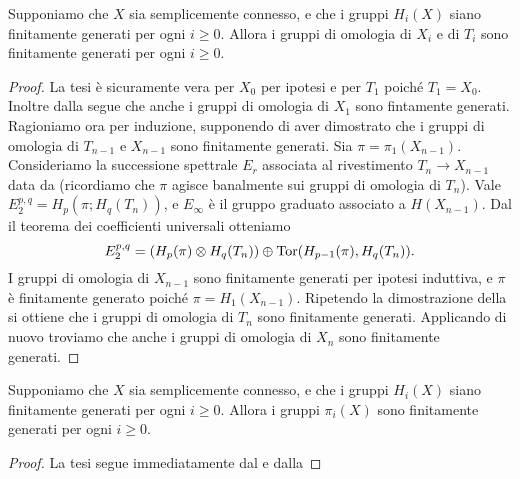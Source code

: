 \begin{proposition}
Supponiamo che $X$ sia semplicemente connesso, e che i gruppi $H_i(X)$ siano finitamente generati per ogni $i\ge 0$. Allora i gruppi di omologia di $X_i$ e di $T_i$ sono finitamente generati per ogni $i\ge 0$.
\end{proposition}
\begin{proof}
La tesi è sicuramente vera per $X_0$ per ipotesi e per $T_1$ poiché $T_1=X_0$. Inoltre dalla  segue che anche i gruppi di omologia di $X_1$ sono fintamente generati. Ragioniamo ora per induzione, supponendo di aver dimostrato che i gruppi di omologia di $T_{n-1}$ e $X_{n-1}$ sono finitamente generati. Sia $\pi=\pi_1(X_{n-1})$. Consideriamo la successione spettrale $E_r$ associata al rivestimento $T_n\to X_{n-1}$ data da \missing{} (ricordiamo che $\pi$ agisce banalmente sui gruppi di omologia di $T_n$). Vale $E^{p,q}_2=H_p(\pi;H_q(T_n))$, e $E_\infty$ è il gruppo graduato associato a $H(X_{n-1})$. Dal il teorema dei coefficienti universali otteniamo
$$
E^{p,q}_2=(H_p(\pi)\mathbin{\otimes} H_q(T_n))\mathbin{\oplus}\operatorname{Tor}(H_{p-1}(\pi),H_q(T_n)).
$$
I gruppi di omologia di $X_{n-1}$ sono finitamente generati per ipotesi induttiva, e $\pi$ è finitamente generato poiché $\pi=H_1(X_{n-1})$.  %
Ripetendo la dimostrazione della  si ottiene che i gruppi di omologia di $T_n$ sono finitamente generati. Applicando di nuovo  troviamo che anche i gruppi di omologia di $X_n$ sono finitamente generati.
\end{proof}

\begin{corollary}
Supponiamo che $X$ sia semplicemente connesso, e che i gruppi $H_i(X)$ siano finitamente generati per ogni $i\ge 0$. Allora i gruppi $\pi_i(X)$ sono finitamente generati per ogni $i\ge 0$.
\end{corollary}
\begin{proof}
La tesi segue immediatamente dal  e dalla 
\end{proof}

